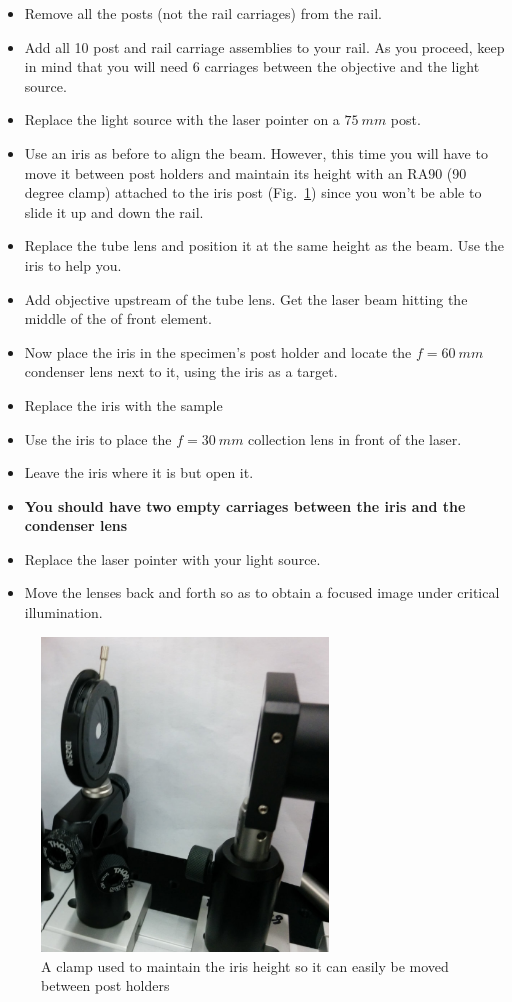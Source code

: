 \documentclass[a4paper]{report}
\begin{document}
\begin{itemize}
\item Remove all the posts (not the rail carriages) from the rail.
\item Add all 10 post and rail carriage assemblies to your rail. As you proceed, keep in mind that you will need 6 carriages between the objective and the light source.
\item Replace the light source with the laser pointer on a $75~mm$ post. 
\item Use an iris as before to align the beam. However, this time you will have to move it between post holders and maintain its height with an RA90 (90 degree clamp) 
attached to the iris post (Fig.~\ref{fig:clampedIris}) since you won't be able to slide it up and down the rail.
\item Replace the tube lens and position it at the same height as the beam. Use the iris to help you.
\item Add objective upstream of the tube lens. Get the laser beam hitting the middle of the of front element. 
\item Now place the iris in the specimen's post holder and locate the $f=60~mm$ condenser lens next to it, using the iris as a target. 
\item Replace the iris with the sample
\item Use the iris to place the $f=30~mm$ collection lens in front of the laser.
\item Leave the iris where it is but open it. 
\item \textbf{You should have two empty carriages between the iris and the condenser lens}
\item Replace the laser pointer with your light source. 
\item Move the lenses back and forth so as to obtain a focused image under critical illumination. 
\end{itemize}


\begin{figure}[h]
\center
\includegraphics[width=3in]{clamped_iris.eps}
\caption{A clamp used to maintain the iris height so it can easily be moved between post holders}
\label{fig:clampedIris}
\end{figure}
\end{document}
